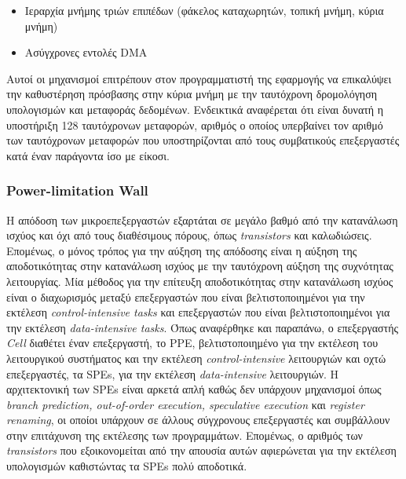 \begin{itemize}

\item{Ιεραρχία μνήμης τριών επιπέδων (φάκελος καταχωρητών, τοπική μνήμη, κύρια μνήμη)}

\item{Ασύγχρονες εντολές \ac{DMA}}

\end{itemize}
\indent
Αυτοί οι μηχανισμοί επιτρέπουν στον προγραμματιστή της εφαρμογής να επικαλύψει την καθυστέρηση πρόσβασης στην κύρια μνήμη με την ταυτόχρονη δρομολόγηση υπολογισμών και μεταφοράς δεδομένων. Ενδεικτικά αναφέρεται ότι είναι δυνατή η υποστήριξη 128 ταυτόχρονων μεταφορών, αριθμός ο οποίος υπερβαίνει τον αριθμό των ταυτόχρονων μεταφορών που υποστηρίζονται από τους συμβατικούς επεξεργαστές κατά έναν παράγοντα ίσο με είκοσι.

\subsubsection{Power-limitation Wall}
\label{subsubsection:subsub3113}
\indent
Η απόδοση των μικροεπεξεργαστών εξαρτάται σε μεγάλο βαθμό από την κατανάλωση ισχύος και όχι από τους διαθέσιμους πόρους, όπως \textsl{transistors} και καλωδιώσεις. Επομένως, ο μόνος τρόπος για την αύξηση της απόδοσης είναι η αύξηση της αποδοτικότητας στην κατανάλωση ισχύος με την ταυτόχρονη αύξηση της συχνότητας λειτουργίας.\newline \indent
Μία μέθοδος για την επίτευξη αποδοτικότητας στην κατανάλωση ισχύος είναι ο διαχωρισμός μεταξύ επεξεργαστών που είναι βελτιστοποιημένοι για την εκτέλεση \textsl{control-intensive tasks} και επεξεργαστών που είναι βελτιστοποιημένοι για την εκτέλεση \textsl{data-intensive tasks}.\newline \indent
Όπως αναφέρθηκε και παραπάνω, ο επεξεργαστής \textsl{Cell} διαθέτει έναν επεξεργαστή, το \ac{PPE}, βελτιστοποιημένο για την εκτέλεση του λειτουργικού συστήματος και την εκτέλεση \textsl{control-intensive} λειτουργιών και οχτώ επεξεργαστές, τα \acp{SPE}, για την εκτέλεση \textsl{data-intensive} λειτουργιών. Η αρχιτεκτονική των \acp{SPE} είναι αρκετά απλή καθώς δεν υπάρχουν μηχανισμοί όπως \textsl{branch prediction, out-of-order execution, speculative execution} και \textsl{register renaming}, οι οποίοι υπάρχουν σε άλλους σύγχρονους επεξεργαστές και συμβάλλουν στην επιτάχυνση της εκτέλεσης των προγραμμάτων. Επομένως, ο αριθμός των \textsl{transistors} που εξοικονομείται από την απουσία αυτών αφιερώνεται για την εκτέλεση υπολογισμών καθιστώντας τα \acp{SPE} πολύ αποδοτικά.

